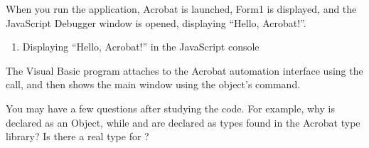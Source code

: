 \documentclass[letterpaper,12pt,english,openany,oneside]{sphinxmanual}
\begin{document}
When you run the application, Acrobat is launched, Form1 is displayed, and the JavaScript Debugger window is opened, displaying “Hello, Acrobat!”.
\begin{enumerate}
%
\item {} 
Displaying “Hello, Acrobat!” in the JavaScript console

\end{enumerate}

\begin{sphinxVerbatim}[commandchars=\\\{\}]
   
   
   

         

          
      
      
      
          
         
     
 
\end{sphinxVerbatim}

The Visual Basic program attaches to the Acrobat automation interface using the  call, and then shows the main window using the  object’s  command.

You may have a few questions after studying the code. For example, why is  declared as an Object, while  and  are declared as types found in the Acrobat type library? Is there a real type for  ?
\end{document}
